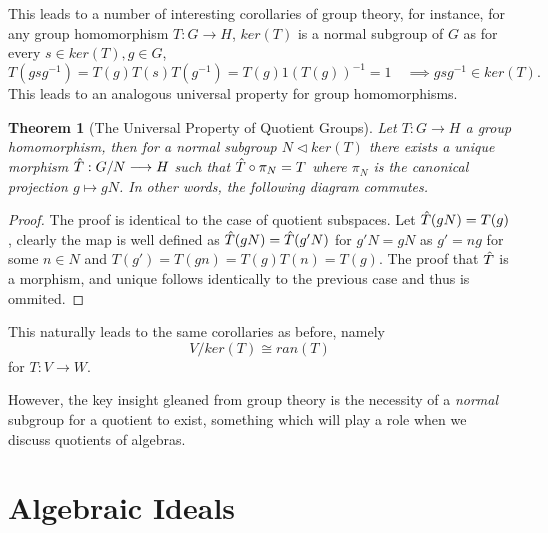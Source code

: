 \documentclass[12pt]{extarticle}
\newtheorem*{theorem}{Theorem}
\renewcommand{\mapsto}[0]{\longmapsto}
\renewcommand{\to}[0]{\longrightarrow}
\begin{document}
This leads to a number of interesting corollaries of group theory, for instance, for any group homomorphism $T : G \to H$, $ker(T)$ is a normal subgroup of $G$ as for every $s \in ker(T), g \in G$, 
\[
  T(gsg^{-1}) = T(g)T(s)T(g^{-1}) = T(g)1(T(g))^{-1} = 1 \quad \implies gsg^{-1} \in ker(T).
\]
This leads to an analogous universal property for group homomorphisms. 

\begin{theorem}[The Universal Property of Quotient Groups]
  Let $T : G \to H$ a group homomorphism, then for a normal subgroup $N \lhd ker(T)$ there exists a unique morphism $\Hat{T} : G/N \to H$ such that $\Hat{T} \circ \pi_N = T$ where $\pi_N$ is the canonical projection $g \mapsto gN$. In other words, the following diagram commutes. 
  
  \begin{center}
  \end{center}
\end{theorem}
\begin{proof}
  The proof is identical to the case of quotient subspaces. Let $\Hat{T}(gN) = T(g)$, clearly the map is well defined as $\Hat{T}(gN) = \Hat{T}(g'N)$ for $g'N = gN$ as $g' = ng$ for some $n \in N$ and $T(g') = T(gn) = T(g)T(n) = T(g)$. The proof that $\Hat{T}$ is a morphism, and unique follows identically to the previous case and thus is ommited.
\end{proof}

This naturally leads to the same corollaries as before, namely 
\[
  V / ker(T) \cong ran(T)
\]
for $T: V \to W$. 

However, the key insight gleaned from group theory is the necessity of a \textit{normal} subgroup for a quotient to exist, something which will play a role when we discuss quotients of algebras.

\section*{Algebraic Ideals}
\end{document}
